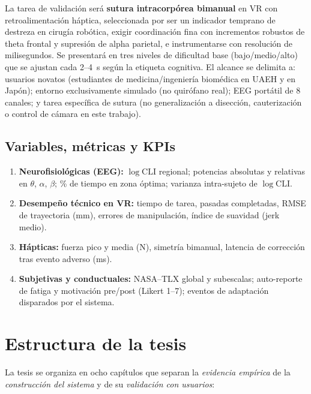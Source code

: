 \documentclass[12pt]{article}
\begin{document}
La tarea de validación será \textbf{sutura intracorpórea
bimanual} en VR con retroalimentación háptica, seleccionada por
ser un indicador temprano de destreza en cirugía robótica, exigir
coordinación fina con incrementos robustos de theta frontal y
supresión de alpha parietal, e instrumentarse con resolución de
milisegundos. Se presentará en tres niveles de dificultad base
(bajo/medio/alto) que se ajustan cada 2--4~s según la etiqueta
cognitiva. El alcance se delimita a: usuarios novatos (estudiantes
de medicina/ingeniería biomédica en UAEH y en Japón); entorno
exclusivamente simulado (no quirófano real); EEG portátil de 8
canales; y tarea específica de sutura (no generalización a
disección, cauterización o control de cámara en este trabajo).

\subsection{Variables, métricas y KPIs}

\begin{enumerate}
    \item \textbf{Neurofisiológicas (EEG):}
    $\log\mathrm{CLI}$ regional; potencias absolutas y relativas
    en $\theta$, $\alpha$, $\beta$; \% de tiempo en zona óptima;
    varianza intra-sujeto de $\log\mathrm{CLI}$.
    \item \textbf{Desempeño técnico en VR:} tiempo de tarea,
    pasadas completadas, RMSE de trayectoria (mm), errores de
    manipulación, índice de suavidad (jerk medio).
    \item \textbf{Hápticas:} fuerza pico y media (N), simetría
    bimanual, latencia de corrección tras evento adverso (ms).
    \item \textbf{Subjetivas y conductuales:} NASA--TLX global y
    subescalas; auto-reporte de fatiga y motivación pre/post
    (Likert 1--7); eventos de adaptación disparados por el
    sistema.
\end{enumerate}


\section{Estructura de la tesis}

La tesis se organiza en ocho capítulos que separan la
\emph{evidencia empírica} de la \emph{construcción del sistema} y
de su \emph{validación con usuarios}:
\end{document}

